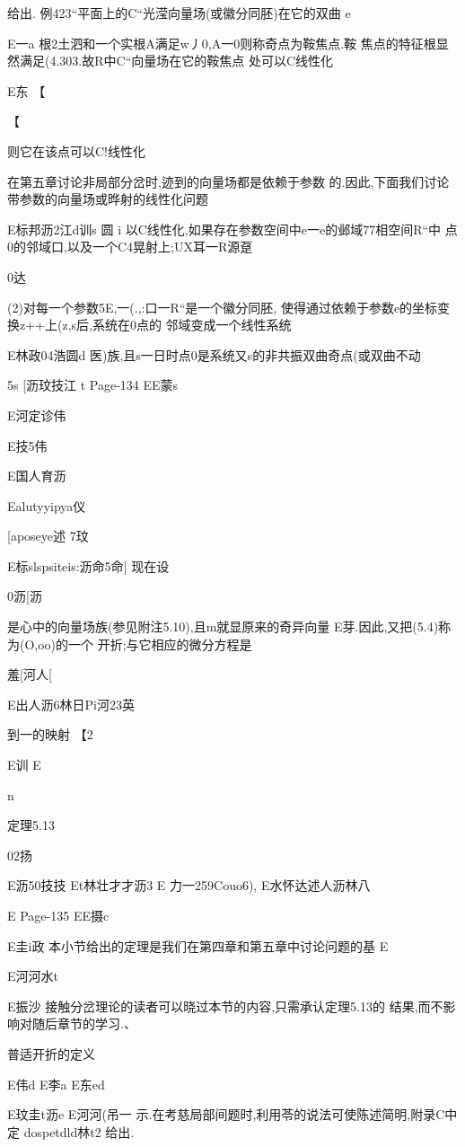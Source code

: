 {{{给出.
例423“平面上的C“光滢向量场(或徽分同胚)在它的双曲
e

E一a
根2土泗和一个实根A满足w丿0,A一0则称奇点为鞍焦点.鞍
焦点的特征根显然满足(4.303.故R中C“向量场在它的鞍焦点
处可以C线性化

E东
【

【

则它在该点可以C!线性化

在第五章讨论非局部分岔时,迹到的向量场都是依赖于参数
的.因此,下面我们讨论带参数的向量场或晔射的线性化问题

E标邦沥2江d训s
圆
i
以C线性化,如果存在参数空间中e一e的邺域77相空间R“中
点0的邻域口,以及一个C4晃射上;UX耳一R源趸

0达

(2)对每一个参数5E,一(.,:口一R“是一个徽分同胚,
使得通过依赖于参数e的坐标变换z++上(z,s后,系统在0点的
邻域变成一个线性系统

E林政04浩圆d
医)族,且s一日时点0是系统又s的非共振双曲奇点(或双曲不动

5s
[沥玟技江
t
Page-134
EE蒙s

E河定诊伟

E技5伟

E国人育沥

Ealutyyipya仪

[aposeye述
7玟

E标slspsiteis:沥命5命|
现在设

0沥[沥

是心中的向量场族(参见附注5.10),且m就显原来的奇异向量
E芽.因此,又把(5.4)称为(O,oo)的一个
开折;与它相应的微分方程是

羞[河人[

E出人沥6林日Pi河23英

到一的映射
【2

E训
E

n

定理5.13

02扬

E沥50技技
Et林壮才才沥3
E
力一259Couo6),
E水怀达述人沥林八

E
Page-135
EE摄c

E圭i政
本小节给出的定理是我们在第四章和第五章中讨论问题的基
E

E河河水t

E振沙
接触分岔理论的读者可以晓过本节的内容,只需承认定理5.13的
结果,而不影响对随后章节的学习.、

普适开折的定义

E伟d
E李a
E东ed

E玟圭t沥e
E河河(吊一
示.在考慈局部间题时,利用苓的说法可使陈述简明,附录C中定
dospetdld林t2
给出.

}}}
